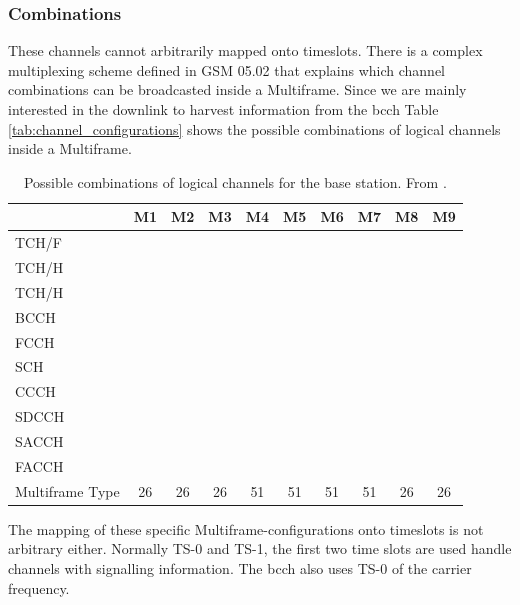 \subsubsection{Combinations}
These channels cannot arbitrarily mapped onto timeslots.
There is a complex multiplexing scheme defined in GSM 05.02 \cite{gsm0502} that explains which channel combinations can be broadcasted inside a Multiframe.
Since we are mainly interested in the downlink to harvest information from the \gls{bcch} Table \ref{tab:channel_configurations} shows the possible combinations of logical channels inside a Multiframe.
\begin{table}
	\centering
	\begin{tabular}{lccccccccc}
	\toprule
						&M1&M2&M3&M4&M5&M6&M7&M8&M9\\
	\midrule
	TCH/F				&\cellcolor[gray]{0.7}&&&&&&&\cellcolor[gray]{0.7}&\cellcolor[gray]{0.7}\\
	TCH/H				&&\cellcolor[gray]{0.7}&\cellcolor[gray]{0.7}&&&&&&\\
	TCH/H				&&&\cellcolor[gray]{0.7}&&&&&&\\
	BCCH				&&&&\cellcolor[gray]{0.7}&\cellcolor[gray]{0.7}&\cellcolor[gray]{0.7}&&&\\
	FCCH				&&&&\cellcolor[gray]{0.7}&\cellcolor[gray]{0.7}&&&&\\
	SCH					&&&&\cellcolor[gray]{0.7}&\cellcolor[gray]{0.7}&&&&\\
	CCCH				&&&&\cellcolor[gray]{0.7}&\cellcolor[gray]{0.7}&\cellcolor[gray]{0.7}&&&\\
	SDCCH				&&&&&\cellcolor[gray]{0.7}&&\cellcolor[gray]{0.7}&&\\
	SACCH				&\cellcolor[gray]{0.7}&\cellcolor[gray]{0.7}&\cellcolor[gray]{0.7}&&\cellcolor[gray]{0.7}&&\cellcolor[gray]{0.7}&\cellcolor[gray]{0.7}&\cellcolor[gray]{0.7}\\
	FACCH				&\cellcolor[gray]{0.7}&\cellcolor[gray]{0.7}&\cellcolor[gray]{0.7}&&&&&\cellcolor[gray]{0.7}&\\
	\midrule
	Multiframe Type		&26&26&26&51&51&51&51&26&26\\
	\bottomrule
	\end{tabular}
	\caption{Possible combinations of logical channels for the base station. From \cite{GSM2009}.}
\end{table}
The mapping of these specific Multiframe-configurations onto timeslots is not arbitrary either.
Normally TS-0 and TS-1, the first two time slots are used handle channels with signalling information.
The \gls{bcch} also uses TS-0 of the carrier frequency.

